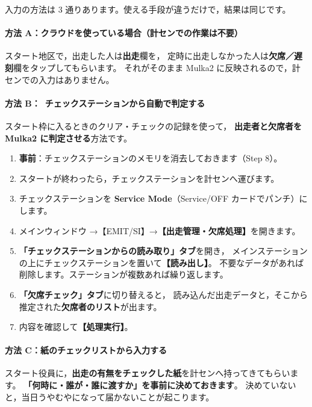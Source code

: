 入力の方法は 3 通りあります。使える手段が違うだけで，結果は同じです。

\paragraph{方法 A：クラウドを使っている場合（計センでの作業は不要）}

スタート地区で，出走した人は\textbf{出走}欄を，
定時に出走しなかった人は\textbf{欠席／遅刻}欄をタップしてもらいます。
それがそのまま Mulka2 に反映されるので，計センでの入力はありません。

\paragraph{方法 B：\tSI\ チェックステーションから自動で判定する}

スタート枠に入るときのクリア・チェックの記録を使って，
\textbf{出走者と欠席者を Mulka2 に判定させる}方法です。

\begin{enumerate}
\item \textbf{事前}：チェックステーションのメモリを消去しておきます（Step 8）。
\item スタートが終わったら，チェックステーションを計センへ運びます。
\item チェックステーションを \textbf{Service Mode}（Service/OFF カードでパンチ）にします。
\item メインウィンドウ →【EMIT/SI】→\textbf{【出走管理・欠席処理】}を開きます。\ver
\item \textbf{「チェックステーションからの読み取り」タブ}を開き，
      メインステーションの上にチェックステーションを置いて\textbf{【読み出し】}。
      不要なデータがあれば削除します。ステーションが複数あれば繰り返します。
\item \textbf{「欠席チェック」タブ}に切り替えると，
      読み込んだ出走データと，そこから推定された\textbf{欠席者のリスト}が出ます。
\item 内容を確認して\textbf{【処理実行】}。
\end{enumerate}

\paragraph{方法 C：紙のチェックリストから入力する}

スタート役員に，\textbf{出走の有無をチェックした紙}を計センへ持ってきてもらいます。
\textbf{「何時に・誰が・誰に渡すか」を事前に決めておきます}。
決めていないと，当日うやむやになって届かないことが起こります。

